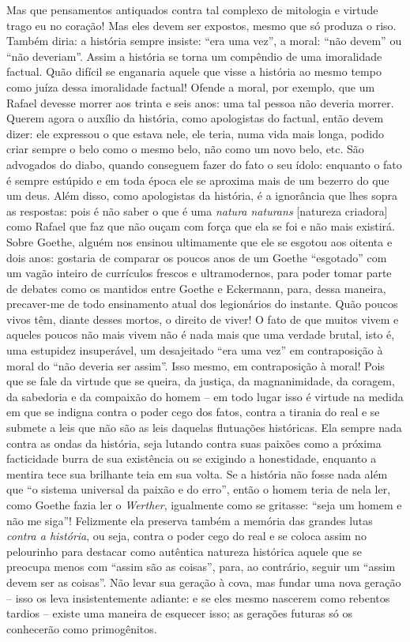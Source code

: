 Mas que pensamentos antiquados contra tal complexo de mitologia e
virtude trago eu no coração! Mas eles devem ser expostos, mesmo que só
produza o riso. Também diria: a história sempre insiste: ``era uma
vez'', a moral: ``não devem'' ou ``não deveriam''. Assim a história se
torna um compêndio de uma imoralidade factual. Quão difícil se enganaria
aquele que visse a história ao mesmo tempo como juíza dessa imoralidade
factual! Ofende a moral, por exemplo, que um Rafael devesse morrer aos
trinta e seis anos: uma tal pessoa não deveria morrer. Querem agora o
auxílio da história, como apologistas do factual, então devem dizer: ele
expressou o que estava nele, ele teria, numa vida mais longa, podido
criar sempre o belo como o mesmo belo, não como um novo belo, etc. São
advogados do diabo, quando conseguem fazer do fato o seu ídolo: enquanto
o fato é sempre estúpido e em toda época ele se aproxima mais de um
bezerro do que um deus. Além disso, como apologistas da história, é a
ignorância que lhes sopra as respostas: pois é não saber o que é uma
\emph{natura naturans} {[}natureza criadora{]} como Rafael que faz que
não ouçam com força que ela se foi e não mais existirá. Sobre Goethe,
alguém nos ensinou ultimamente que ele se esgotou aos oitenta e dois
anos: gostaria de comparar os poucos anos de um Goethe ``esgotado'' com
um vagão inteiro de currículos frescos e ultramodernos, para poder tomar
parte de debates como os mantidos entre Goethe e Eckermann, para, dessa
maneira, precaver-me de todo ensinamento atual dos legionários do
instante. Quão poucos vivos têm, diante desses mortos, o direito de
viver! O fato de que muitos vivem e aqueles poucos não mais vivem não é
nada mais que uma verdade brutal, isto é, uma estupidez insuperável, um
desajeitado ``era uma vez'' em contraposição à moral do ``não deveria
ser assim''. Isso mesmo, em contraposição à moral! Pois que se fale da
virtude que se queira, da justiça, da magnanimidade, da coragem, da
sabedoria e da compaixão do homem -- em todo lugar isso é virtude na
medida em que se indigna contra o poder cego dos fatos, contra a tirania
do real e se submete a leis que não são as leis daquelas flutuações
históricas. Ela sempre nada contra as ondas da história, seja lutando
contra suas paixões como a próxima facticidade burra de sua existência
ou se exigindo a honestidade, enquanto a mentira tece sua brilhante teia
em sua volta. Se a história não fosse nada além que ``o sistema
universal da paixão e do erro'', então o homem teria de nela ler, como
Goethe fazia ler o \emph{Werther}, igualmente como se gritasse: ``seja
um homem e não me siga''! Felizmente ela preserva também a memória das
grandes lutas \emph{contra a história}, ou seja, contra o poder cego do
real e se coloca assim no pelourinho para destacar como autêntica
natureza histórica aquele que se preocupa menos com ``assim são as
coisas'', para, ao contrário, seguir um ``assim devem ser as coisas''.
Não levar sua geração à cova, mas fundar uma nova geração -- isso os
leva insistentemente adiante: e se eles mesmo nascerem como rebentos
tardios -- existe uma maneira de esquecer isso; as gerações futuras só
os conhecerão como primogênitos.

